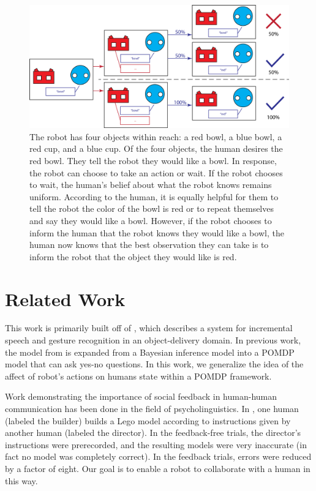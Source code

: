 \documentclass[conference]{IEEEtran}
\begin{document}
\begin{figure}
	\begin{center}
		\includegraphics[scale=0.6]{resources/diagram}
		\caption{
The robot has four objects within reach: a red bowl, a blue bowl, a red cup, and a blue cup. Of the four objects, the human desires the red bowl. They tell the robot they would like a bowl. In response, the robot can choose to take an action or wait. 
If the robot chooses to wait, the human's belief about what the robot knows remains uniform. According to the human, it is equally helpful for them to tell the robot the color of the bowl is red or to repeat themselves and say they would like a bowl.  
However, if the robot chooses to inform the human that the robot knows they would like a bowl, the human now knows that the best observation they can take is to inform the robot that the object they would like is red. }
		\label{example}
	\end{center}
\end{figure}

\section{Related Work}

This work is primarily built off of \citet{whitney16}, which describes a system for incremental speech and gesture recognition in an object-delivery domain. In previous work\citep{socialfeedback}, the model from \citet{whitney16} is expanded from a Bayesian inference model into a POMDP model that can ask yes-no questions. In this work, we generalize the idea of the affect of robot's actions on humans state within a POMDP framework. 

Work demonstrating the importance of social feedback in human-human
communication has been done in the field of psycholinguistics. In  \citet{clark04}, one human (labeled the builder)
builds a Lego model according to instructions given by another human
(labeled the director). In the feedback-free trials, the director's
instructions were prerecorded, and the resulting models were very
inaccurate (in fact no model was completely correct). In the feedback
trials, errors were reduced by a factor of eight. Our goal is to
enable a robot to collaborate with a human in this way.
\end{document}
